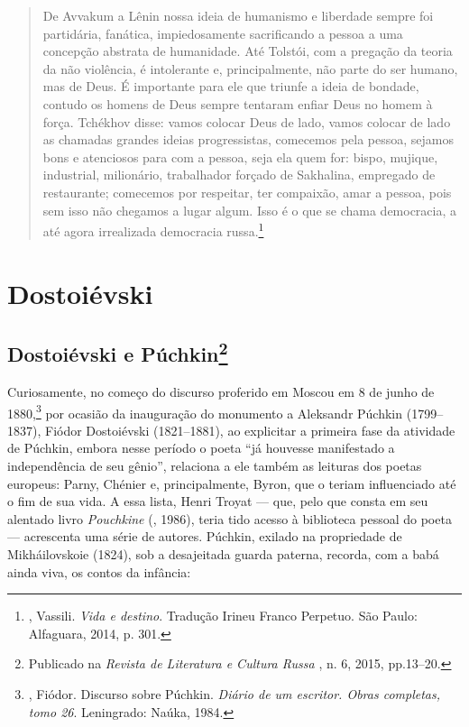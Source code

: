 \begin{quotation}
De Avvakum a Lênin nossa ideia de humanismo e liberdade sempre foi partidária, fanática, impiedosamente sacrificando a pessoa a uma concepção abstrata de humanidade. Até Tolstói, com a pregação da teoria da não violência, é intolerante e, principalmente, não parte do ser humano, mas de Deus. É importante para ele que triunfe a ideia de bondade, contudo os homens de Deus sempre tentaram enfiar Deus no homem à força. Tchékhov disse: vamos colocar Deus de lado, vamos colocar de
lado as chamadas grandes ideias progressistas, comecemos pela pessoa, sejamos bons e atenciosos para com a pessoa, seja ela quem for: bispo, mujique, industrial, milionário, trabalhador forçado de Sakhalina, empregado de restaurante; comecemos por respeitar, ter compaixão, amar a pessoa, pois sem isso não chegamos a lugar algum. Isso é o que se chama democracia, a até agora irrealizada democracia russa.\footnote{, Vassili. \emph{Vida e destino}. Tradução Irineu Franco Perpetuo. São Paulo: Alfaguara, 2014, p. 301.}
\end{quotation}


\part{Dostoiévski}

\chapter{Dostoiévski e Púchkin\footnote{Publicado na \emph{Revista de Literatura e Cultura Russa} \protect{}, n. 6, 2015, pp.13--20.}}
\label{dostopuchkin}

Curiosamente, no começo do discurso proferido em Moscou em 8 de junho de
1880,\footnote{, Fiódor. Discurso sobre Púchkin. \emph{Diário de um escritor. Obras completas, tomo 26}. Leningrado: Naúka, 1984.} por ocasião da inauguração do monumento a Aleksandr Púchkin (1799--1837), Fiódor Dostoiévski (1821--1881), ao explicitar a primeira fase da atividade de Púchkin, embora nesse período o poeta ``já houvesse manifestado a independência de seu gênio'', relaciona a ele também as leituras dos poetas europeus: Parny, Chénier e, principalmente, Byron, que o teriam influenciado até o fim de sua vida. A essa lista, Henri Troyat --- que, pelo que consta em seu alentado livro \emph{Pouchkine} (, 1986), teria tido acesso à biblioteca pessoal do poeta --- acrescenta uma série de autores. Púchkin, exilado na propriedade de Mikháilovskoie (1824), sob a desajeitada guarda paterna, recorda, com a babá ainda viva, os contos da infância:

